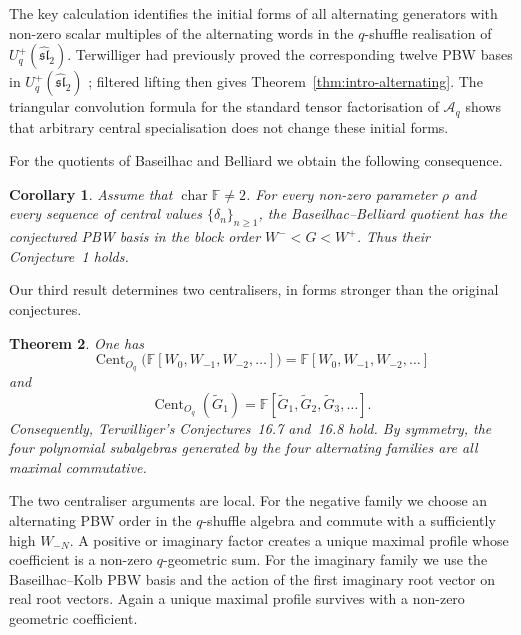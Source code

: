 \documentclass[11pt]{extarticle}
\newtheorem{theorem}{Theorem}[section]
\newtheorem{corollary}[theorem]{Corollary}
\theoremstyle{definition}
\theoremstyle{remark}
\numberwithin{equation}{section}
\newcommand{\F}{\mathbb F}
\newcommand{\Oq}{O_q}
\newcommand{\Aq}{\mathcal A_q}
\newcommand{\Uplus}{U_q^+(\widehat{\mathfrak{sl}}_2)}
\DeclareMathOperator{\Cent}{Cent}
\begin{document}
The key calculation identifies the initial forms of all alternating
generators with non-zero scalar multiples of the alternating words in the
$q$-shuffle realisation of $\Uplus$.  Terwilliger had previously proved the
corresponding twelve PBW bases in $\Uplus$
\cite{Terwilliger2019Alternating}; filtered lifting then gives
Theorem~\ref{thm:intro-alternating}.  The triangular convolution formula
for the standard tensor factorisation of $\Aq$ shows that arbitrary central
specialisation does not change these initial forms.

For the quotients of Baseilhac and Belliard we obtain the following
consequence.

\begin{corollary}
\label{cor:intro-BB}
Assume that $\operatorname{char}\F\neq2$.  For every non-zero parameter
$\rho$ and every sequence of central values $\{\delta_n\}_{n\geq1}$, the
Baseilhac--Belliard quotient has the conjectured PBW basis in the block order
$W^-<G<W^+$.  Thus their Conjecture~1 holds.
\end{corollary}

Our third result determines two centralisers, in forms stronger than the
original conjectures.

\begin{theorem}
\label{thm:intro-centralisers}
One has
\[
 \Cent_{\Oq}\bigl(\F[W_0,W_{-1},W_{-2},\ldots]\bigr)
 =\F[W_0,W_{-1},W_{-2},\ldots]
\]
and
\[
 \Cent_{\Oq}(\widetilde G_1)
 =\F[\widetilde G_1,\widetilde G_2,\widetilde G_3,\ldots].
\]
Consequently, Terwilliger's Conjectures~16.7 and~16.8 hold.  By symmetry,
the four polynomial subalgebras generated by the four alternating families
are all maximal commutative.
\end{theorem}

The two centraliser arguments are local.  For the negative family we choose
an alternating PBW order in the $q$-shuffle algebra and commute with a
sufficiently high $W_{-N}$.  A positive or imaginary factor creates a unique
maximal profile whose coefficient is a non-zero $q$-geometric sum.  For the
imaginary family we use the Baseilhac--Kolb PBW basis and the action of the
first imaginary root vector on real root vectors.  Again a unique maximal
profile survives with a non-zero geometric coefficient.
\end{document}
